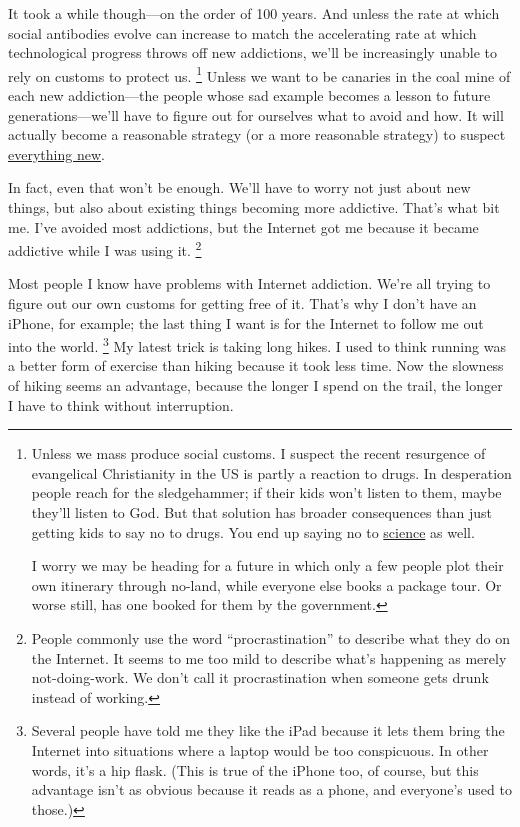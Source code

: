 It took a while though---on the order of 100 years. And unless the rate
at which social antibodies evolve can increase to match the accelerating
rate at which technological progress throws off new addictions, we'll be
increasingly unable to rely on customs to protect us.
\footnote{Unless we mass produce social customs. I suspect the recent
resurgence of evangelical Christianity in the US is partly a reaction to
drugs. In desperation people reach for the sledgehammer; if their kids
won't listen to them, maybe they'll listen to God. But that solution has
broader consequences than just getting kids to say no to drugs. You end
up saying no to
\href{https://www.youtube.com/watch?v=GbXgsMxOPtI}{science} as well.

I worry we may be heading for a future in which only a few people plot
their own itinerary through no-land, while everyone else books a package
tour. Or worse still, has one booked for them by the government.} Unless we want to be canaries in the coal mine
of each new addiction---the people whose sad example becomes a lesson to
future generations---we'll have to figure out for ourselves what to
avoid and how. It will actually become a reasonable strategy (or a more
reasonable strategy) to suspect
\href{http://en.wikipedia.org/wiki/Paleolithic_diet}{everything new}.

In fact, even that won't be enough. We'll have to worry not just about
new things, but also about existing things becoming more addictive.
That's what bit me. I've avoided most addictions, but the Internet got
me because it became addictive while I was using it.
\footnote{People commonly use the word ``procrastination'' to describe
what they do on the Internet. It seems to me too mild to describe what's
happening as merely not-doing-work. We don't call it procrastination
when someone gets drunk instead of working.}

Most people I know have problems with Internet addiction. We're all
trying to figure out our own customs for getting free of it. That's why
I don't have an iPhone, for example; the last thing I want is for the
Internet to follow me out into the world. \footnote{Several people have told me they like the iPad because it lets
them bring the Internet into situations where a laptop would be too
conspicuous. In other words, it's a hip flask. (This is true of the
iPhone too, of course, but this advantage isn't as obvious because it
reads as a phone, and everyone's used to those.)} My
latest trick is taking long hikes. I used to think running was a better
form of exercise than hiking because it took less time. Now the slowness
of hiking seems an advantage, because the longer I spend on the trail,
the longer I have to think without interruption.


